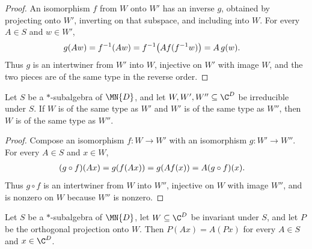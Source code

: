\begin{proof}
    \leanok
    An isomorphism $f$ from $W$ onto $W'$ has an inverse $g$, obtained by
    projecting onto $W'$, inverting on that subspace, and including into
    $W$. For every $A\in S$ and $w\in W'$,
    \begin{align}
        g(Aw)
        &=f^{-1}(Aw)
          =f^{-1}\!\left(Af(f^{-1}w)\right)
          =A\,g(w).
        \notag
    \end{align}
    Thus $g$ is an intertwiner from $W'$ into $W$, injective on $W'$ with
    image $W$, and the two pieces are of the same type in the reverse order.
\end{proof}

\begin{lemma}%
    \label{lem:starSubalgebra_sameIsotype_trans}
    \leanok
    Let $S$ be a $*$-subalgebra of $\MN{D}$, and let
    $W,W',W''\subseteq\C^D$ be irreducible under $S$. If $W$ is of the
    same type as $W'$ and $W'$ is of the same type as $W''$, then $W$ is
    of the same type as $W''$.
\end{lemma}

\begin{proof}
    \leanok
    Compose an isomorphism $f:W\to W'$ with an isomorphism $g:W'\to W''$.
    For every $A\in S$ and $x\in W$,
    \begin{align}
        (g\circ f)(Ax)
        &=g(f(Ax))
          =g(Af(x))
          =A(g\circ f)(x).
        \notag
    \end{align}
    Thus $g\circ f$ is an intertwiner from $W$ into $W''$, injective on
    $W$ with image $W''$, and is nonzero on $W$ because $W''$ is nonzero.
\end{proof}

\begin{lemma}%
    \label{lem:starSubalgebra_projection_commutant}
    \leanok
    Let $S$ be a $*$-subalgebra of $\MN{D}$, let
    $W\subseteq\C^D$ be invariant under $S$, and let $P$ be the
    orthogonal projection onto $W$. Then $P(Ax)=A(Px)$ for every
    $A\in S$ and $x\in\C^D$.
\end{lemma}

